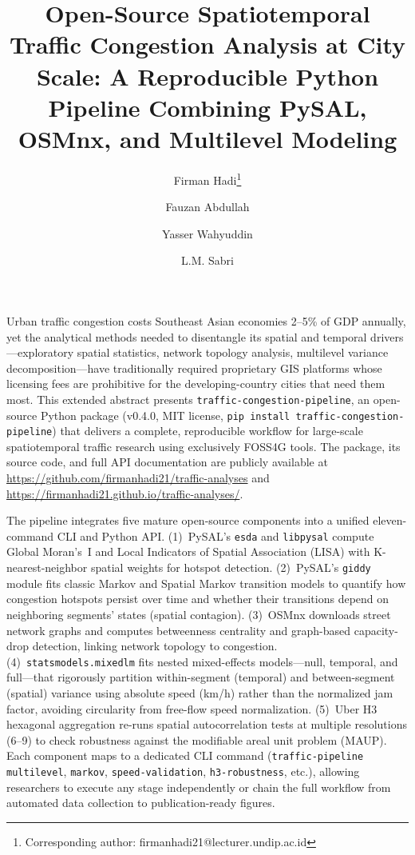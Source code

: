 \documentclass[11pt,a4paper]{article}
\title{\textbf{Open-Source Spatiotemporal Traffic Congestion Analysis at City Scale: A Reproducible Python Pipeline Combining PySAL, OSMnx, and Multilevel Modeling}}
\author[1]{Firman Hadi\thanks{Corresponding author: firmanhadi21@lecturer.undip.ac.id}}
\author[2]{Fauzan Abdullah}
\author[1]{Yasser Wahyuddin}
\author[1]{L.M. Sabri}
\affil[1]{Department of Geodetic Engineering, Universitas Diponegoro, Semarang, Indonesia}
\affil[2]{Department of Statistics, Faculty of Sciences and Mathematics, Universitas Diponegoro, Semarang, Indonesia}
\date{}
\begin{document}
\maketitle

\noindent
Urban traffic congestion costs Southeast Asian economies 2--5\% of GDP annually, yet the analytical methods needed to disentangle its spatial and temporal drivers---exploratory spatial statistics, network topology analysis, multilevel variance decomposition---have traditionally required proprietary GIS platforms whose licensing fees are prohibitive for the developing-country cities that need them most. This extended abstract presents \texttt{traffic-congestion-pipeline}, an open-source Python package (v0.4.0, MIT license, \texttt{pip install traffic-congestion-pipeline}) that delivers a complete, reproducible workflow for large-scale spatiotemporal traffic research using exclusively FOSS4G tools. The package, its source code, and full API documentation are publicly available at \url{https://github.com/firmanhadi21/traffic-analyses} and \url{https://firmanhadi21.github.io/traffic-analyses/}.

\medskip
The pipeline integrates five mature open-source components into a unified eleven-command CLI and Python API. (1)~PySAL's \texttt{esda} and \texttt{libpysal} compute Global Moran's~I and Local Indicators of Spatial Association (LISA) with K-nearest-neighbor spatial weights for hotspot detection. (2)~PySAL's \texttt{giddy} module fits classic Markov and Spatial Markov transition models to quantify how congestion hotspots persist over time and whether their transitions depend on neighboring segments' states (spatial contagion). (3)~OSMnx downloads street network graphs and computes betweenness centrality and graph-based capacity-drop detection, linking network topology to congestion. (4)~\texttt{statsmodels.mixedlm} fits nested mixed-effects models---null, temporal, and full---that rigorously partition within-segment (temporal) and between-segment (spatial) variance using absolute speed (km/h) rather than the normalized jam factor, avoiding circularity from free-flow speed normalization. (5)~Uber H3 hexagonal aggregation re-runs spatial autocorrelation tests at multiple resolutions (6--9) to check robustness against the modifiable areal unit problem (MAUP). Each component maps to a dedicated CLI command (\texttt{traffic-pipeline multilevel}, \texttt{markov}, \texttt{speed-validation}, \texttt{h3-robustness}, etc.), allowing researchers to execute any stage independently or chain the full workflow from automated data collection to publication-ready figures.
\end{document}
